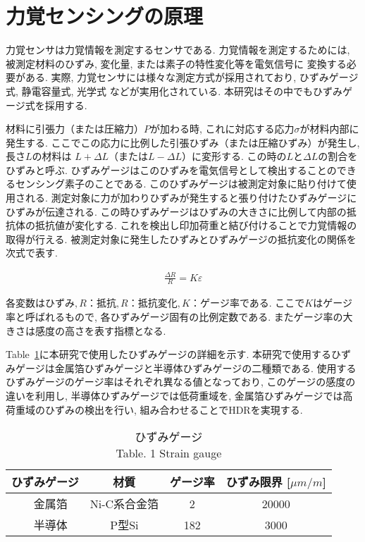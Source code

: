 \section{力覚センシングの原理}
力覚センサは力覚情報を測定するセンサである. 
力覚情報を測定するためには, 被測定材料のひずみ, 変化量, または素子の特性変化等を電気信号に
変換する必要がある. 
実際, 力覚センサには様々な測定方式が採用されており, 
ひずみゲージ式\cite{nishiwaki2002six}\cite{Liang2010}, 
静電容量式\cite{Beyeler2009}, 
光学式\cite{Kim2013a}\cite{su20093}\cite{polygerinos2010novel}
などが実用化されている.
本研究はその中でもひずみゲージ式を採用する. 

材料に引張力（または圧縮力）$P$が加わる時, これに対応する応力$σ$が材料内部に発生する.
ここでこの応力に比例した引張ひずみ（または圧縮ひずみ）が発生し, 長さ$L$の材料は
$L + \Delta L$（または$L - \Delta L$）に変形する. 
この時の$L$と$\Delta L$の割合をひずみと呼ぶ. 
ひずみゲージはこのひずみを電気信号として検出することのできるセンシング素子のことである. このひずみゲージは被測定対象に貼り付けて使用される. 
測定対象に力が加わりひずみが発生すると張り付けたひずみゲージにひずみが伝達される. 
この時ひずみゲージはひずみの大きさに比例して内部の抵抗体の抵抗値が変化する. 
これを検出し印加荷重と結び付けることで力覚情報の取得が行える. 
被測定対象に発生したひずみとひずみゲージの抵抗変化の関係を次式で表す. 

\begin{eqnarray}
    \frac{\Delta R}{R} = K \varepsilon 
\end{eqnarray}

各変数は$ひずみ, R：抵抗, R：抵抗変化, K：ゲージ率$である. 
ここで$K$はゲージ率と呼ばれるもので, 各ひずみゲージ固有の比例定数である. 
またゲージ率の大きさは感度の高さを表す指標となる. 

Table~\ref{tb:gage}に本研究で使用したひずみゲージの詳細を示す. 
本研究で使用するひずみゲージは金属箔ひずみゲージと半導体ひずみゲージの二種類である. 
使用するひずみゲージのゲージ率はそれぞれ異なる値となっており,  
このゲージの感度の違いを利用し, 半導体ひずみゲージでは低荷重域を, 
金属箔ひずみゲージでは高荷重域のひずみの検出を行い, 
組み合わせることでHDRを実現する. 

\begin{table}[h]
    \caption{ひずみゲージ\\Table. 1 Strain gauge}\label{tb:gage}
    \begin{center}
     \begin{tabular}{ c c c c }
      \hline
      ひずみゲージ & 材質 & ゲージ率 & ひずみ限界 [$\mu m/m$] \\
      \hline
    　金属箔 & Ni-C系合金箔 & 2 & 20000\\
      \hline
    　半導体 & P型Si & 182 & 3000 \\
      \hline   
     \end{tabular}
    \end{center}
   \end{table}



